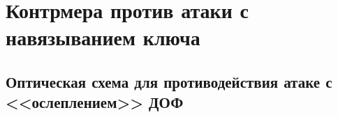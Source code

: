 \chapter{Контрмера против атаки с навязыванием ключа} \label{ch:ch3}

\section{Оптическая схема для противодействия атаке с <<ослеплением>> ДОФ} \label{ch:ch3/sect1}


